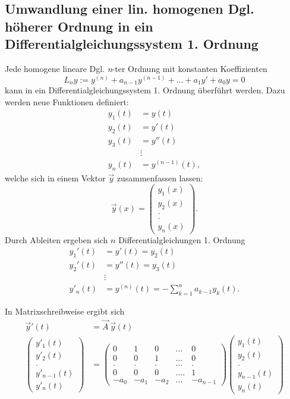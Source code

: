 \subsection*{Umwandlung einer lin. homogenen Dgl. h\"oherer Ordnung in ein Differentialgleichungssystem 1. Ordnung}
Jede homogene lineare Dgl. \emph{n}-ter Ordnung mit konstanten Koeffizienten
\[ 
L_n y := y^{(n)} + a_{n-1} y^{(n-1)} + ... + a_1 y'+ a_0 y = 0
\]
kann in ein Differentialgleichungssystem 1. Ordnung \"uberf\"uhrt werden.
Dazu werden neue Funktionen definiert:
\begin{align*}
  y_1(t) &= y(t) \\
  y_2(t) &= y'(t) \\
  y_3(t) &= y''(t) \\
        &\vdots \\
  y_n(t) &= y^{(n-1)}(t),
\end{align*}
welche sich in einem Vektor $\vec y$ zusammenfassen lassen:
$$
\vec y(x) = \begin{pmatrix} y_1(x) \\ y_2(x) \\ . \\ . \\ y_n(x)  \end{pmatrix}.
$$
\noindent
Durch Ableiten ergeben sich $n$ Differentialgleichungen 1. Ordnung
\begin{align*}
  y_1'(t) &= y'(t) = y_2(t) \\
  y_2'(t) &= y''(t) = y_3(t) \\
        &\vdots \\
  y'_n(t) &= y^{(n)}(t) = - \sum_{k=1}^{n} a_{k-1}y_k(t).
\end{align*}

\noindent
In Matrixschreibweise ergibt sich
\begin{align*}
\vec y'(t) &= \vec A \, \vec y(t)  \\
 \begin{pmatrix} y'_1(t) \\ y'_2(t) \\ . \\ y'_{n-1}(t) \\ y'_n(t)  \end{pmatrix}     &=    \begin{pmatrix}
0 & 1 & 0 & ... & 0 \\
0 & 0 & 1 & ... & 0 \\
. & . & . & ... & . \\
0 & 0 & 0 & ....& 1 \\
-a_0 & -a_1 & -a_2 & ... & -a_{n-1}
\end{pmatrix} 
\begin{pmatrix} y_1(t) \\ y_2(t) \\ . \\ y_{n-1}(t)\\ y_n(t)  \end{pmatrix}
\end{align*}

